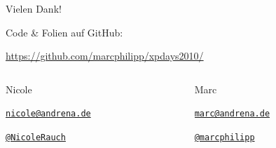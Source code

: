 \begin{frame}{Vielen Dank!}

	Code \& Folien auf GitHub:
	\begin{center}
		\url{https://github.com/marcphilipp/xpdays2010/}
	\end{center}

\begin{columns}[t] 
\begin{column}{4.6cm} 
	\begin{block}{Nicole}
        \begin{description}[Twitter]
		\item[E-Mail]  \href{mailto:nicole@andrena.de}{\texttt{nicole@andrena.de}}
		\item[Twitter] \href{http://twitter.com/NicoleRauch}{\texttt{@NicoleRauch}}
        \end{description}
	\end{block}
\end{column} 
\begin{column}{4.6cm} 
	\begin{block}{Marc}
        \begin{description}[Twitter]
		\item[E-Mail]  \href{mailto:marc@andrena.de}{\texttt{marc@andrena.de}}
		\item[Twitter] \href{http://twitter.com/marcphilipp}{\texttt{@marcphilipp}}
        \end{description}
	\end{block}
\end{column} 
\end{columns}
\end{frame}

